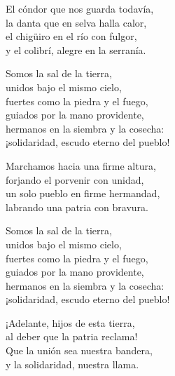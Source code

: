 \begin{lyrics}
El cóndor que nos guarda todavía,\\
la danta que en selva halla calor,\\
el chigüiro en el río con fulgor,\\
y el colibrí, alegre en la serranía.

Somos la sal de la tierra,\\
unidos bajo el mismo cielo,\\
fuertes como la piedra y el fuego,\\
guiados por la mano providente,\\
hermanos en la siembra y la cosecha:\\
¡solidaridad, escudo eterno del pueblo!

Marchamos hacia una firme altura,\\
forjando el porvenir con unidad,\\
un solo pueblo en firme hermandad,\\
labrando una patria con bravura.

Somos la sal de la tierra,\\
unidos bajo el mismo cielo,\\
fuertes como la piedra y el fuego,\\
guiados por la mano providente,\\
hermanos en la siembra y la cosecha:\\
¡solidaridad, escudo eterno del pueblo!

¡Adelante, hijos de esta tierra,\\
al deber que la patria reclama!\\
Que la unión sea nuestra bandera,\\
y la solidaridad, nuestra llama.
\end{lyrics}

